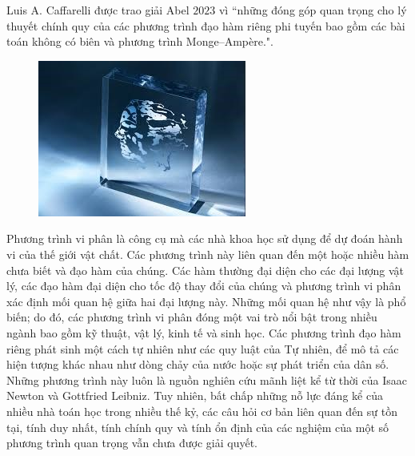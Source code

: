 \vspace*{140pt}


\begin{multicols}{2}	
	Luis A. Caffarelli được trao giải Abel $2023$ vì ``những đóng góp quan trọng cho lý thuyết chính quy của các phương trình đạo hàm riêng phi tuyến bao gồm các bài toán không có biên và phương trình Monge–Ampère.".
	\begin{figure}[H]
		\vspace*{-5pt}
		\centering
		\captionsetup{labelformat= empty, justification=centering}
		\includegraphics[width= 1\linewidth]{1}
		\vspace*{-15pt}
	\end{figure}
	Phương trình vi phân là công cụ mà các nhà khoa học sử dụng để dự đoán hành vi của thế giới vật chất. Các phương trình này liên quan đến một hoặc nhiều hàm chưa biết và đạo hàm của chúng. Các hàm thường đại diện cho các đại lượng vật lý, các đạo hàm đại diện cho tốc độ thay đổi của chúng và phương trình vi phân xác định mối quan hệ giữa hai đại lượng này. Những mối quan hệ như vậy là phổ biến; do đó, các phương trình vi phân đóng một vai trò nổi bật trong nhiều ngành bao gồm kỹ thuật, vật lý, kinh tế và sinh học.
	\vskip 0.1cm
	Các phương trình đạo hàm riêng phát sinh một cách tự nhiên như các quy luật của Tự nhiên, để mô tả các hiện tượng khác nhau như dòng chảy của nước hoặc sự phát triển của dân số. Những phương trình này luôn là nguồn nghiên cứu mãnh liệt kể từ thời của Isaac Newton và Gottfried Leibniz. Tuy nhiên, bất chấp những nỗ lực đáng kể của nhiều nhà toán học trong nhiều thế kỷ, các câu hỏi cơ bản liên quan đến sự tồn tại, tính duy nhất, tính chính quy và tính ổn định của các nghiệm của một số phương trình quan trọng vẫn chưa được giải quyết.

\end{multicols}
